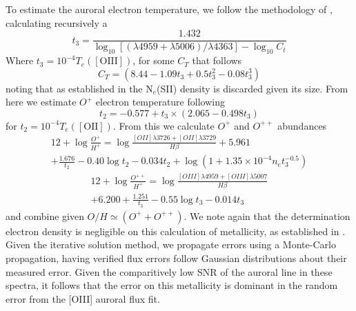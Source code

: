 \documentclass[fleqn,usenatbib]{mnras}
\begin{document}
To estimate the auroral electron temperature, we follow the methodology of \cite{izotov2006}, calculating recursively a 
\begin{equation}
t_3=\frac{1.432}{\log_{10}[(\lambda4959+\lambda5006)/\lambda4363]-\log_{10}C_t}
\end{equation}
Where $t_3=10^{-4}T_e(\mathrm{[OIII]})$, for some $C_T$ that follows
\begin{equation}
C_T = (8.44 - 1.09t_3 + 0.5t_3^2-0.08t_3^3)
\end{equation}
noting that as established in \cite{izotov2006} the N$_e$(SII) density is discarded given its size. From here we estimate $O^+$ electron temperature following \cite{jiang}
\begin{equation}
t_2 = -0.577 + t_3 \times(2.065-0.498t_3)
\end{equation}
for $t_2=10^{-4}T_e(\mathrm{[OII]})$. From this we calculate $O^+$ and $O^{++}$ abundances 
\begin{multline}
    12 + \log \frac{O^{+}}{H^{+}} = \log \frac{[OII]\lambda 3726 + [OII]\lambda 3729}{H\beta} + 5.961 \\+ \frac{1.676}{t_2} - 0.40\log t_2 - 0.034t_2 + \log(1 + 1.35 \times 10^{-4} n_e t_3^{-0.5})
\end{multline}
\begin{multline}
    12 + \log \frac{O^{++}}{H^{+}} = \log \frac{[OIII]\lambda 4959 + [OIII]\lambda 5007}{H\beta}\\ + 6.200 + \frac{1.251}{t_3} - 0.55\log t_3 - 0.014t_3
\end{multline}
and combine given $O/H\simeq(O^+ + O^{++})$. We note again that the determination electron density is negligible on this calculation of metallicity, as established in \cite{izotov2006,jiang}. Given the iterative solution method, we propagate errors using a Monte-Carlo propagation, having verified flux errors follow Gaussian distributions about their measured error. Given the comparitively low SNR of the auroral line in these spectra, it follows that the error on this metallicity is dominant in the random error from the [OIII] auroral flux fit. 
\end{document}
